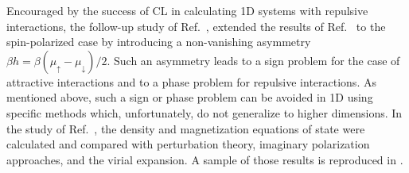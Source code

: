 \documentclass[../main.tex]{subfiles}
\begin{document}
Encouraged by the success of CL in calculating 1D systems with repulsive interactions, the follow-up study of Ref.~\cite{PhysRevD.98.054507}, extended the results of
Ref.~\cite{PRD95094502} to the spin-polarized case by introducing a non-vanishing asymmetry $\beta h = \beta (\mu_\uparrow - \mu_\downarrow)/2$.
Such an asymmetry leads to a sign problem for the case of attractive interactions and to a phase problem for repulsive interactions. As mentioned above, such a sign or
phase problem can be avoided in 1D using specific methods which, unfortunately, do not generalize to higher dimensions.
In the study of Ref.~\cite{PhysRevD.98.054507}, the density and magnetization equations of state were calculated and compared with perturbation theory,
imaginary polarization approaches, and the virial expansion. A sample of those results is reproduced in .

\end{document}
